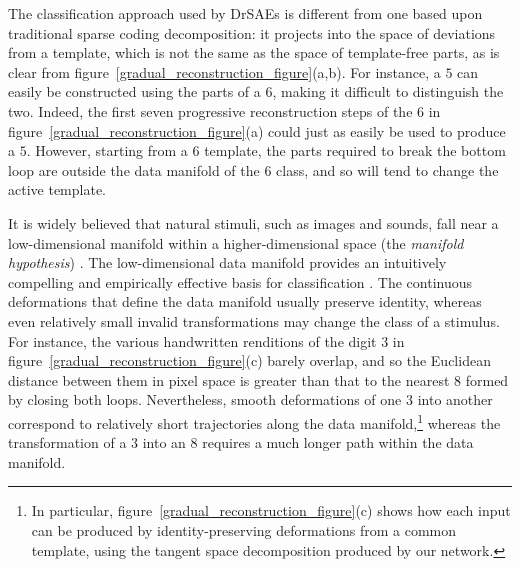 \documentclass{article} %
\begin{document}
The classification approach used by DrSAEs is different from one based upon traditional sparse coding decomposition: it projects into the space of deviations from a template, which is not the same as the space of template-free parts, as is clear from figure~\ref{gradual_reconstruction_figure}(a,b).  For instance, a $5$ can easily be constructed using the parts of a $6$, making it difficult to distinguish the two.  Indeed, the first seven progressive reconstruction steps of the $6$ in figure~\ref{gradual_reconstruction_figure}(a) could just as easily be used to produce a $5$.  However, starting from a $6$ template, the parts required to break the bottom loop are outside the data manifold of the $6$ class, and so will tend to change the active template.  

It is widely believed that natural stimuli, such as images and sounds, fall near a low-dimensional manifold within a higher-dimensional space (the \emph{manifold hypothesis}) \citep{lee2003, olshausen2004, bengio2012}.  %
The low-dimensional data manifold provides an intuitively compelling and empirically effective basis for classification \citep{simard1993, simard1998, rifai2011b}.  The continuous deformations that define the data manifold usually preserve identity, whereas even relatively small invalid transformations may change the class of a stimulus.  For instance, the various handwritten renditions of the digit $3$ in figure~\ref{gradual_reconstruction_figure}(c) barely overlap, and so the Euclidean distance between them in pixel space is greater than that to the nearest $8$ formed by closing both loops.  Nevertheless, smooth deformations of one $3$ into another correspond to relatively short trajectories along the data manifold,\footnote{In particular, figure~\ref{gradual_reconstruction_figure}(c) shows how each input can be produced by identity-preserving deformations from a common template, using the tangent space decomposition produced by our network.} whereas the transformation of a $3$ into an $8$ requires a much longer path within the data manifold.  
\end{document}
